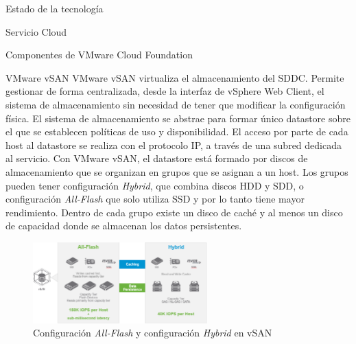 \begin{chapter}{Estado de la tecnología}
\begin{section}{Servicio Cloud}
\begin{subsection}{Componentes de VMware Cloud Foundation}
    \begin{subsubsection}{VMware vSAN}
        VMware vSAN virtualiza el almacenamiento del SDDC. Permite gestionar de forma centralizada, desde la interfaz de vSphere Web Client, el sistema de almacenamiento sin necesidad de tener que modificar la configuración física. El sistema de almacenamiento se abstrae para formar único datastore sobre el que se establecen políticas de uso y disponibilidad. El acceso por parte de cada host al datastore se realiza con el protocolo IP, a través de una subred dedicada al servicio. Con VMware vSAN, el datastore está formado por discos de almacenamiento que se organizan en grupos que se asignan a un host. Los grupos pueden tener configuración \textit{Hybrid}, que combina discos HDD y SDD, o configuración \textit{All-Flash} que solo utiliza SSD y por lo tanto tiene mayor rendimiento. Dentro de cada grupo existe un disco de caché y al menos un disco de capacidad donde se almacenan los datos persistentes\cite{operacionesVSAN}. 
        
        \begin{figure}[h]
        \centering
            \includegraphics[width=0.6\textwidth]{imaxes/cap2recursos/rendimientoVSAN.png}
            \caption{Configuración \textit{All-Flash} y configuración \textit{Hybrid} en vSAN}
            \label{fig:performance-Hybrid-AllFlash-vSAN}
        \end{figure}
        \FloatBarrier
    \end{subsubsection}
    

\end{subsection}
\end{section}
\end{chapter}
